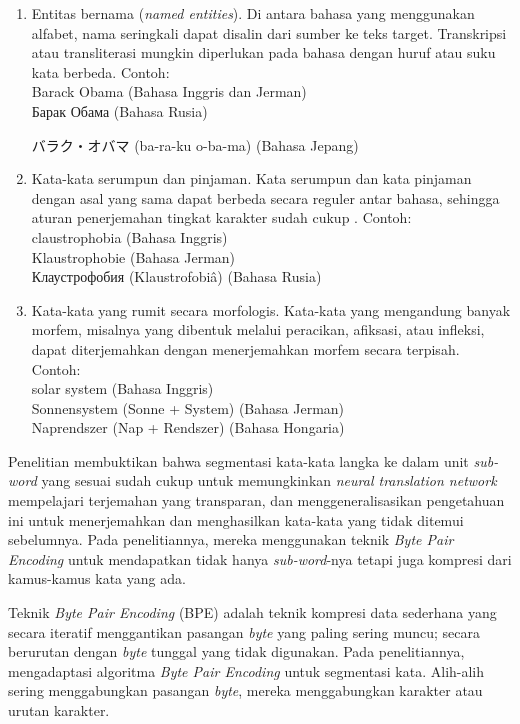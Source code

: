 \documentclass[conference]{IEEEtran}
\begin{document}
	\begin{enumerate}
	    \item Entitas bernama (\textit{named entities}). Di antara bahasa yang menggunakan alfabet, nama seringkali dapat disalin dari sumber ke teks target. Transkripsi atau transliterasi mungkin diperlukan pada bahasa dengan huruf atau suku kata berbeda. Contoh: \\
	    Barack Obama (Bahasa Inggris dan Jerman) \\
	    \foreignlanguage{russian}{Барак Обама} (Bahasa Rusia) \\
	    \begin{CJK}{UTF8}{min}
	    バラク・オバマ (ba-ra-ku o-ba-ma) (Bahasa Jepang)
	    \end{CJK}

	    \item Kata-kata serumpun dan pinjaman. Kata serumpun dan kata pinjaman dengan asal yang sama dapat berbeda secara reguler antar bahasa, sehingga aturan penerjemahan tingkat karakter sudah cukup \cite{b17}. Contoh:  \\
	    claustrophobia (Bahasa Inggris) \\
	    Klaustrophobie (Bahasa Jerman) \\
	    \foreignlanguage{russian}{Клаустрофобия} (Klaustrofobiâ) (Bahasa Rusia)

	    \item Kata-kata yang rumit secara morfologis. Kata-kata yang mengandung banyak morfem, misalnya yang dibentuk melalui peracikan, afiksasi, atau infleksi, dapat diterjemahkan dengan menerjemahkan morfem secara terpisah. Contoh:  \\
	    solar system (Bahasa Inggris) \\
	    Sonnensystem (Sonne + System) (Bahasa Jerman) \\
	    Naprendszer (Nap + Rendszer) (Bahasa Hongaria)
	\end{enumerate}

	Penelitian \cite{b16} membuktikan bahwa segmentasi kata-kata langka ke dalam unit \textit{sub-word} yang sesuai sudah cukup untuk memungkinkan \textit{neural translation network} mempelajari terjemahan yang transparan, dan menggeneralisasikan pengetahuan ini untuk menerjemahkan dan menghasilkan kata-kata yang tidak ditemui sebelumnya. Pada penelitiannya, mereka menggunakan teknik \textit{Byte Pair Encoding} untuk mendapatkan tidak hanya \textit{sub-word}-nya tetapi juga kompresi dari kamus-kamus kata yang ada.

	Teknik \textit{Byte Pair Encoding} (BPE) \cite{b18} adalah teknik kompresi data sederhana yang secara iteratif menggantikan pasangan \textit{byte} yang paling sering muncu; secara berurutan dengan \textit{byte} tunggal yang tidak digunakan. Pada penelitiannya, \cite{b16} mengadaptasi algoritma \textit{Byte Pair Encoding} untuk segmentasi kata. Alih-alih sering menggabungkan pasangan \textit{byte}, mereka menggabungkan karakter atau urutan karakter.
\end{document}

